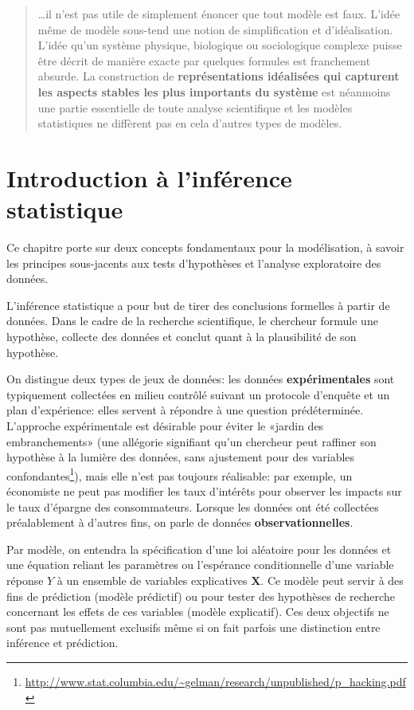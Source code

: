 \documentclass[
  11pt,
  letterpaper,
]{article}
\renewcommand{\href}[2]{#2\footnote{\url{#1}}}
\theoremstyle{definition}
\theoremstyle{definition}
\theoremstyle{definition}
\theoremstyle{definition}
\theoremstyle{remark}
\begin{document}
\begin{quote}
\ldots il n'est pas utile de simplement énoncer que tout modèle est faux. L'idée même de modèle sous-tend une notion de simplification et d'idéalisation. L'idée qu'un système physique, biologique ou sociologique complexe puisse être décrit de manière exacte par quelques formules est franchement absurde. La construction de \textbf{représentations idéalisées qui capturent les aspects stables les plus importants du système} est néanmoins une partie essentielle de toute analyse scientifique et les modèles statistiques ne diffèrent pas en cela d'autres types de modèles.
\end{quote}

\hypertarget{intro}{%
\section{Introduction à l'inférence statistique}\label{intro}}

Ce chapitre porte sur deux concepts fondamentaux pour la modélisation, à savoir les principes sous-jacents aux tests d'hypothèses et l'analyse exploratoire des données.

L'inférence statistique a pour but de tirer des conclusions formelles à partir de données. Dans le cadre de la recherche scientifique, le chercheur formule une hypothèse, collecte des données et conclut quant à la plausibilité de son hypothèse.

On distingue deux types de jeux de données: les données \textbf{expérimentales} sont typiquement collectées en milieu contrôlé suivant un protocole d'enquête et un plan d'expérience: elles servent à répondre à une question prédéterminée. L'approche expérimentale est désirable pour éviter le «jardin des embranchements» (une \href{http://www.stat.columbia.edu/~gelman/research/unpublished/p_hacking.pdf}{allégorie signifiant qu'un chercheur peut raffiner son hypothèse à la lumière des données, sans ajustement pour des variables confondantes}), mais elle n'est pas toujours réalisable: par exemple, un économiste ne peut pas modifier les taux d'intérêts pour observer les impacts sur le taux d'épargne des consommateurs. Lorsque les données ont été collectées préalablement à d'autres fins, on parle de données \textbf{observationnelles}.

Par modèle, on entendra la spécification d'une loi aléatoire pour les données et une équation reliant les paramètres ou l'espérance conditionnelle d'une variable réponse \(Y\) à un ensemble de variables explicatives \(\mathbf{X}\). Ce modèle peut servir à des fins de prédiction (modèle prédictif) ou pour tester des hypothèses de recherche concernant les effets de
ces variables (modèle explicatif). Ces deux objectifs ne sont pas mutuellement exclusifs même si on fait parfois une distinction entre inférence et prédiction.
\end{document}
